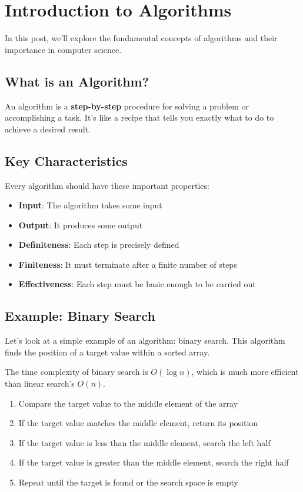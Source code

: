 \section{Introduction to Algorithms}

In this post, we'll explore the fundamental concepts of algorithms and their importance in computer science.

\subsection{What is an Algorithm?}

An algorithm is a \textbf{step-by-step} procedure for solving a problem or accomplishing a task. It's like a recipe that tells you exactly what to do to achieve a desired result.

\subsection{Key Characteristics}

Every algorithm should have these important properties:
\begin{itemize}
    \item \textbf{Input}: The algorithm takes some input
    \item \textbf{Output}: It produces some output
    \item \textbf{Definiteness}: Each step is precisely defined
    \item \textbf{Finiteness}: It must terminate after a finite number of steps
    \item \textbf{Effectiveness}: Each step must be basic enough to be carried out
\end{itemize}

\subsection{Example: Binary Search}

Let's look at a simple example of an algorithm: binary search. This algorithm finds the position of a target value within a sorted array.

The time complexity of binary search is $O(\log n)$, which is much more efficient than linear search's $O(n)$.

\begin{enumerate}
    \item Compare the target value to the middle element of the array
    \item If the target value matches the middle element, return its position
    \item If the target value is less than the middle element, search the left half
    \item If the target value is greater than the middle element, search the right half
    \item Repeat until the target is found or the search space is empty
\end{enumerate} 